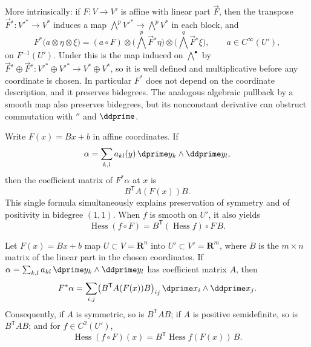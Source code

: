 More intrinsically: if $F:V\to V'$ is affine with linear part
$\overrightarrow F$, then the transpose
$\overrightarrow F{}^*:V'^*\to V^*$ induces a map
$\bigwedge^p V'^*\to\bigwedge^pV^*$ in each block, and
\[
 F^*\bigl(a\otimes\eta\otimes\xi\bigr)
 =(a\circ F)\otimes
   \bigl(\textstyle\bigwedge^p\overrightarrow F{}^*\eta\bigr)\otimes
   \bigl(\textstyle\bigwedge^q\overrightarrow F{}^*\xi\bigr),
 \qquad a\in C^\infty(U'),
\]
on $F^{-1}(U')$.  Under  this is the map
induced on $\bigwedge^\bullet$ by
$\overrightarrow F{}^*\oplus\overrightarrow F{}^*:V'^*\oplus V'^*\to
V^*\oplus V^*$, so it is well defined and multiplicative before any
coordinate is chosen.  In particular $F^*$ does not depend on the coordinate
description, and it preserves bidegrees.  The analogous algebraic pullback
by a smooth map also preserves bidegrees, but its nonconstant derivative
can obstruct commutation with $\dprime$ and $\ddprime$.

Write $F(x)=Bx+b$ in affine coordinates.  If
\[
 \alpha=\sum_{k,l}a_{kl}(y)\,
               \dprime y_k\wedge\ddprime y_l,
\]
then the coefficient matrix of $F^*\alpha$ at $x$ is
\[
                         B^{\mathsf T}A(F(x))B.
\]
This single formula simultaneously explains preservation of symmetry and of
positivity in bidegree $(1,1)$.  When $f$ is smooth on $U'$, it also yields
\[
 \operatorname{Hess}(f\circ F)
 =B^{\mathsf T}(\operatorname{Hess}f)\circ F\,B.
\]

\begin{lemma}
\label{lem:ch09-pullback-eleven}
Let $F(x)=Bx+b$ map $U\subset V=\mathbf R^n$ into
$U'\subset V'=\mathbf R^m$, where $B$ is the $m\times n$ matrix of the linear
part in the chosen coordinates.  If
$\alpha=\sum_{k,l}a_{kl}\,\dprime y_k\wedge\ddprime y_l$ has coefficient
matrix $A$, then
\[
 F^*\alpha
 =\sum_{i,j}\bigl(B^{\mathsf T}A(F(x))B\bigr)_{ij}\,
   \dprime x_i\wedge\ddprime x_j .
\]
Consequently, if $A$ is symmetric, so is $B^{\mathsf T}AB$; if $A$ is
positive semidefinite, so is $B^{\mathsf T}AB$; and for $f\in C^2(U')$,
\[
 \operatorname{Hess}(f\circ F)(x)
 =B^{\mathsf T}\operatorname{Hess}f(F(x))\,B .
\]
\end{lemma}

